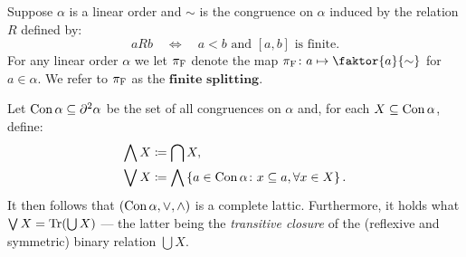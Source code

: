 \begin{dfn}
        Suppose $\alpha$ is a linear order and $\sim$ is the congruence on $\alpha$ induced by the relation $R$ defined by:
        \begin{equation}
        	aRb\quad\iff\quad a<b\text{ and }[a,b]\text{ is finite}.
        \end{equation}
        For any linear order $\alpha$ we let $\pi_\mathrm{F}$ denote the map $\fsplit\colon a\mapsto\faktor{a}{\sim}$ for $a\in\alpha$.  We refer to $\pi_\mathrm{F}$ as the $\textbf{finite splitting}$.
\end{dfn}



\begin{prp}
        Let $\operatorname{Con} \alpha\subseteq\partial^{2}\alpha$ be the set of all congruences on $\alpha$ and, for each $X\subseteq \operatorname{Con}\alpha$, define:
        \begin{align}
            \bigwedge X &\coloneqq\bigcap X,\\
            \bigvee X   &\coloneqq\bigwedge\left\lbrace a\in\operatorname{Con}\alpha\colon x\subseteq a,\forall x\in X \right\rbrace.
        \end{align}
        It then follows that $(\operatorname{Con}\alpha,\vee,\wedge)$ is a complete lattic.  Furthermore, it holds what $\bigvee X=\operatorname{Tr}(\bigcup X)$ --- the latter being the \textit{transitive closure} of the (reflexive and symmetric) binary relation $\bigcup X$.
\end{prp}
